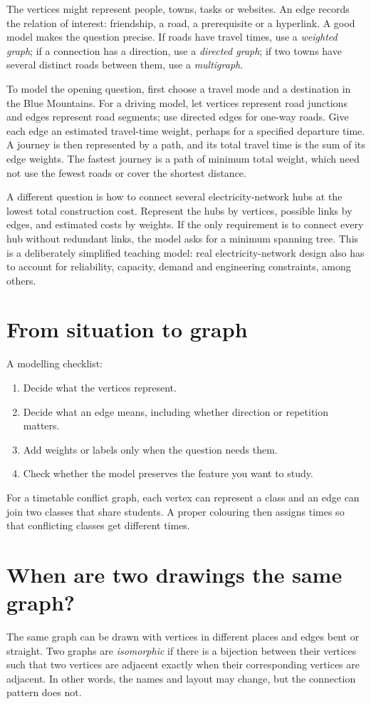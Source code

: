 The vertices might represent people, towns, tasks or websites. An edge records the relation of interest: friendship, a road, a prerequisite or a hyperlink. A good model makes the question precise. If roads have travel times, use a \emph{weighted graph}; if a connection has a direction, use a \emph{directed graph}; if two towns have several distinct roads between them, use a \emph{multigraph}.

To model the opening question, first choose a travel mode and a destination in the Blue Mountains. For a driving model, let vertices represent road junctions and edges represent road segments; use directed edges for one-way roads. Give each edge an estimated travel-time weight, perhaps for a specified departure time. A journey is then represented by a path, and its total travel time is the sum of its edge weights. The fastest journey is a path of minimum total weight, which need not use the fewest roads or cover the shortest distance.

A different question is how to connect several electricity-network hubs at the lowest total construction cost. Represent the hubs by vertices, possible links by edges, and estimated costs by weights. If the only requirement is to connect every hub without redundant links, the model asks for a minimum spanning tree. This is a deliberately simplified teaching model: real electricity-network design also has to account for reliability, capacity, demand and engineering constraints, among others.

\section{From situation to graph}
A modelling checklist:
\begin{enumerate}
\item Decide what the vertices represent.
\item Decide what an edge means, including whether direction or repetition matters.
\item Add weights or labels only when the question needs them.
\item Check whether the model preserves the feature you want to study.
\end{enumerate}
For a timetable conflict graph, each vertex can represent a class and an edge can join two classes that share students. A proper colouring then assigns times so that conflicting classes get different times.

\section{When are two drawings the same graph?}
The same graph can be drawn with vertices in different places and edges bent or straight. Two graphs are \emph{isomorphic} if there is a bijection between their vertices such that two vertices are adjacent exactly when their corresponding vertices are adjacent. In other words, the names and layout may change, but the connection pattern does not.

